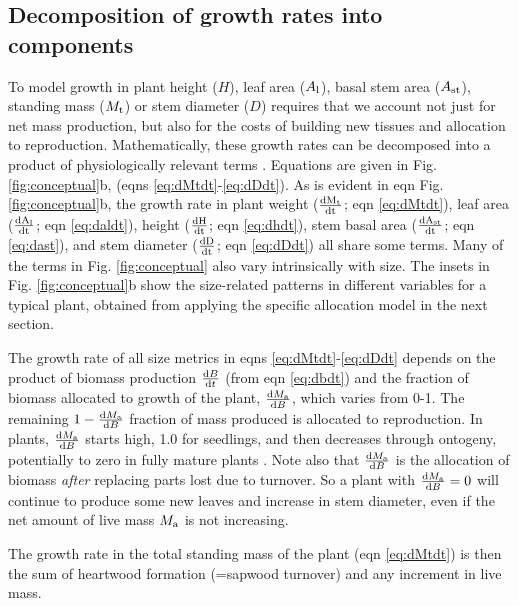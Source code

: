 \documentclass[9pt,twocolumn,twoside]{pnas-new}
\newcommand{\ud}{\ensuremath{\rm{d}}}
\begin{document}
\subsection{Decomposition of growth rates into components}

\setcounter{equation}{9}

To model growth in plant height ($H$), leaf area ($A_{\rm l}$), basal stem area ($ A_{\rm st}$), standing mass ($M_{\rm t}$) or stem diameter ($D$) requires that we account not just for net mass production, but also for the costs of building new tissues and allocation to reproduction. Mathematically, these growth rates can be decomposed into a product of physiologically relevant terms \citep{Falster-2011, Gibert-2016}. Equations are given in Fig. \ref{fig:conceptual}b, (eqns \ref{eq:dMtdt}-\ref{eq:dDdt}). As is evident in eqn  Fig. \ref{fig:conceptual}b, the growth rate in plant weight ($\frac{\ud M_{\rm t} }{\ud t}$; eqn \ref{eq:dMtdt}), leaf area ($\frac{\ud A_{\rm l}}{\ud t}$; eqn \ref{eq:daldt}), height ($\frac{\ud H}{\ud t}$; eqn \ref{eq:dhdt}), stem basal area ($\frac{\ud  A_{\rm st}}{\ud t}$; eqn \ref{eq:dast}), and stem diameter ($\frac{\ud D}{\ud t}$; eqn \ref{eq:dDdt}) all share some terms. Many of the terms in Fig. \ref{fig:conceptual} also vary intrinsically with size. The insets in Fig. \ref{fig:conceptual}b show the size-related patterns in different variables for a typical plant, obtained from applying the specific allocation model in the next section.

The growth rate of all size metrics in eqns \ref{eq:dMtdt}-\ref{eq:dDdt} depends on the product of biomass production $\frac{{\rm d}B} {{\rm d}t}$ (from eqn \ref{eq:dbdt}) and the fraction of biomass allocated to growth of the plant, $\frac{{\rm d}M_{\rm a}}{{\rm d}B}$, which varies from 0-1. The remaining  $1- \frac{{\rm d}M_{\rm a}}{{\rm d}B}$ fraction of mass produced is allocated to reproduction. In plants, $\frac{{\rm d}M_{\rm a}}{{\rm d}B}$ starts high, 1.0 for seedlings, and then decreases through ontogeny, potentially to zero in fully mature plants \citep{Wenk-2015}. Note also that $\frac{{\rm d}M_{\rm a}}{{\rm d}B}$ is the allocation of biomass \emph{after} replacing parts lost due to turnover. So a plant with $\frac{{\rm d}M_{\rm a}}{{\rm d}B}=0$ will continue to produce some new leaves and increase in stem diameter, even if the net amount of live mass $M_{\rm a}$ is not increasing.

The growth rate in the total standing mass of the plant (eqn \ref{eq:dMtdt}) is then the sum of heartwood formation (=sapwood turnover) and any increment in live mass.
\end{document}

